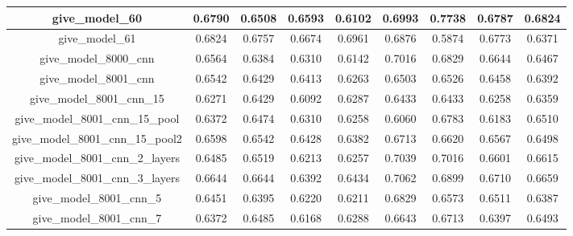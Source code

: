 \begin{table}[!h]
\begin{tabular}{|c|c|c|c|c|c|c|c|c|}
        give\_model\_60                   & 0.6790                        & 0.6508                         & 0.6593                      & 0.6102                  & 0.6993 & 0.7738 & 0.6787 & 0.6824 \\ \hline
        give\_model\_61                   & 0.6824                        & 0.6757                         & 0.6674                      & 0.6961                  & 0.6876 & 0.5874 & 0.6773 & 0.6371 \\ \hline
        give\_model\_8000\_cnn            & 0.6564                        & 0.6384                         & 0.6310                      & 0.6142                  & 0.7016 & 0.6829 & 0.6644 & 0.6467 \\ \hline
        give\_model\_8001\_cnn            & 0.6542                        & 0.6429                         & 0.6413                      & 0.6263                  & 0.6503 & 0.6526 & 0.6458 & 0.6392 \\ \hline
        give\_model\_8001\_cnn\_15        & 0.6271                        & 0.6429                         & 0.6092                      & 0.6287                  & 0.6433 & 0.6433 & 0.6258 & 0.6359 \\ \hline
        give\_model\_8001\_cnn\_15\_pool  & 0.6372                        & 0.6474                         & 0.6310                      & 0.6258                  & 0.6060 & 0.6783 & 0.6183 & 0.6510 \\ \hline
        give\_model\_8001\_cnn\_15\_pool2 & 0.6598                        & 0.6542                         & 0.6428                      & 0.6382                  & 0.6713 & 0.6620 & 0.6567 & 0.6498 \\ \hline
        give\_model\_8001\_cnn\_2\_layers & 0.6485                        & 0.6519                         & 0.6213                      & 0.6257                  & 0.7039 & 0.7016 & 0.6601 & 0.6615 \\ \hline
        give\_model\_8001\_cnn\_3\_layers & 0.6644                        & 0.6644                         & 0.6392                      & 0.6434                  & 0.7062 & 0.6899 & 0.6710 & 0.6659 \\ \hline
        give\_model\_8001\_cnn\_5         & 0.6451                        & 0.6395                         & 0.6220                      & 0.6211                  & 0.6829 & 0.6573 & 0.6511 & 0.6387 \\ \hline
        give\_model\_8001\_cnn\_7         & 0.6372                        & 0.6485                         & 0.6168                      & 0.6288                  & 0.6643 & 0.6713 & 0.6397 & 0.6493 \\ \hline

\end{tabular}
\end{table}
